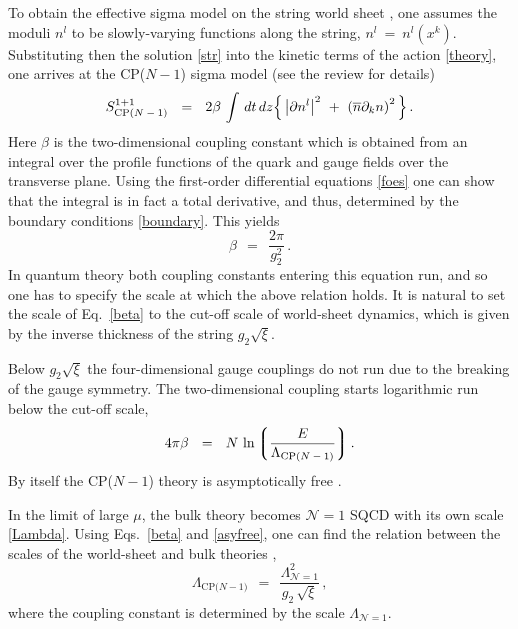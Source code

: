 \documentclass[12pt]{article}
\def\beq{\begin{equation}}
\def\eeq{\end{equation}}
\newcommand{\none}{${\mathcal N}=1$ }
\newcommand{\p}{\partial}
\newcommand{\ov}{\overline}
\newcommand{\mc}[1]{\mathcal{#1}}
\newcommand{\lgr}{\left\lgroup}
\newcommand{\rgr}{\right\rgroup}
\newcommand{\nbar}{\ov{n}}
\begin{document}
	To obtain the effective sigma model on the string  world sheet \cite{ABEKY,SYmon,GSY05}, 
	one assumes the moduli $ n^l $ to be slowly-varying functions along the string, $ n^l ~=~ n^l(x^k) $.
	Substituting then the solution \eqref{str} into the kinetic terms of the action \eqref{theory}, one
	arrives at the CP($N-1$) sigma model (see the review \cite{SYrev} for details)
\begin{align}
\label{cp}
	S_{\text{CP($N-1$)}}^{1+1} ~~=~~ 2\beta\, \int\, dt\,dz 
					\Bigl\{\, \left|\p n^l\right|^2    
						  ~+~  \left(\nbar \p_k n\right)^2\,
					\Bigr\}\,.
\end{align}
	Here $ \beta $ is the two-dimensional coupling constant which is obtained from an integral over
	the profile functions of the quark and gauge fields over the transverse plane. 
	Using the first-order differential equations \eqref{foes} one can show that the integral
	is in fact a total derivative, and thus, determined by the boundary conditions \eqref{boundary}.
	This yields 
\beq
\label{beta}
	\beta ~~=~~ \frac{2\pi}{g_2^2}\,.
\eeq
	In quantum theory both coupling constants entering this equation run, and so one has 
	to specify the scale at which the above relation holds.
	It is natural to set the scale of Eq.~\eqref{beta} to the cut-off scale of world-sheet dynamics,
	which is given by the inverse thickness of the string $ g_2 \sqrt{\xi} $.

	Below $ g_2\sqrt{\xi} $ the four-dimensional gauge couplings do not run due to the breaking
	of the gauge symmetry. 
	The two-dimensional coupling starts logarithmic run below the cut-off scale,
\beq
\label{asyfree}
	4 \pi \beta ~~=~~ N\,  \ln \lgr \frac{E}{\Lambda_\text{CP($N-1$)}} \rgr.
\eeq
	By itself the CP($N-1$) theory is asymptotically free \cite{P75}.

	In the limit of large $ \mu $, the bulk theory becomes \none SQCD with its own scale \eqref{Lambda}.
	Using Eqs.~\eqref{beta} and \eqref{asyfree}, one can find the relation between the scales
	of the world-sheet and bulk theories \cite{GSYmmodel}, 
\beq
\label{cpscale}
	\Lambda_\text{CP($N-1$)} ~~=~~ \frac{ \Lambda_{\mc{N}=1}^2 } { g_2\, \sqrt{\xi}}\,,
\eeq
	where the coupling constant is determined by the scale $ \Lambda_{\mc{N}=1} $.
\end{document}
